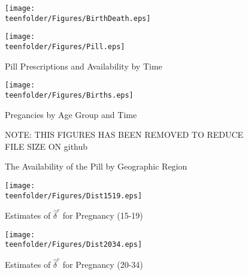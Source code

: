 \begin{figure}[htpb!]
\label{TEENfig:BirthDeath}
\texttt{[image: \\teenfolder/Figures/BirthDeath.eps]} 
\end{figure}

\begin{figure}[htpb!]
\begin{center}
\caption{Pill Prescriptions and Availability by Time}
\vspace{-5mm}
\label{TEENfig:Pilltime}
\texttt{[image: \\teenfolder/Figures/Pill.eps]} 
\end{center}
\end{figure}

\begin{figure}[htpb!]
\begin{center}
\caption{Pregancies by Age Group and Time}
\vspace{-5mm}
\label{TEENfig:Pregtime}
\texttt{[image: \\teenfolder/Figures/Births.eps]} 
\end{center}
\end{figure}

\begin{figure}[htpb!]
\begin{center}
\caption{The Availability of the Pill by Geographic Region}
NOTE: THIS FIGURES HAS BEEN REMOVED TO REDUCE FILE SIZE ON github
\label{TEENfig:PillGeo}
\end{center}
\end{figure}

\begin{figure}[htpb!]
\begin{center}
\caption{Estimates of $\hat\delta^c$ for Pregnancy (15-19)}
\label{TEENfig:Dist1519}
\texttt{[image: \\teenfolder/Figures/Dist1519.eps]} 
\end{center}
\end{figure}

\begin{figure}[htpb!]
\begin{center}
\caption{Estimates of $\hat\delta^c$ for Pregnancy (20-34)}
\label{TEENfig:Dist2034}
\texttt{[image: \\teenfolder/Figures/Dist2034.eps]} 
\end{center}
\end{figure}
